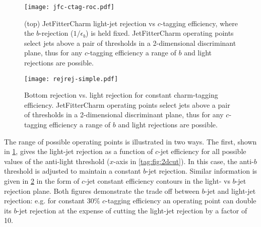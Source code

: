 \begin{figure}
  \begin{center}
    \texttt{[image: jfc-ctag-roc.pdf]}
  \caption[Several ROC curves for various $b$-jet rejections]{
    (top) JetFitterCharm light-jet rejection vs $c$-tagging efficiency, where the $b$-rejection ($1/\epsilon_b$) is held fixed. JetFitterCharm operating points select jets above a pair of thresholds in a 2-dimensional discriminant plane, thus for any $c$-tagging efficiency a range of $b$ and light rejections are possible.}
  \label{fig:perf-roc}
  \end{center}
\end{figure}

\begin{figure}
  \begin{center}
    \texttt{[image: rejrej-simple.pdf]}
  \caption[Light and $b$ rejection for various $c$-tagging efficiencies]{
    Bottom rejection vs. light rejection for constant charm-tagging efficiency. JetFitterCharm operating points select jets above a pair of thresholds in a 2-dimensional discriminant plane, thus for any $c$-tagging efficiency a range of $b$ and light rejections are possible.}
  \label{fig:perf-iso}
  \end{center}
\end{figure}

The range of possible operating points is illustrated in two ways. The first, shown in \cref{fig:perf-roc}, gives the light-jet rejection as a function of $c$-jet efficiency for all possible values of the anti-light threshold ($x$-axis in \cref{tag:fig:2dcut}). In this case, the anti-$b$ threshold is adjusted to maintain a constant $b$-jet rejection. Similar information is given in \cref{fig:perf-iso} in the form of $c$-jet constant efficiency contours in the light- vs $b$-jet rejection plane. Both figures demonstrate the trade off between $b$-jet and light-jet rejection: e.g. for constant 30\% $c$-tagging efficiency an operating point can double its $b$-jet rejection at the expense of cutting the light-jet rejection by a factor of 10.



